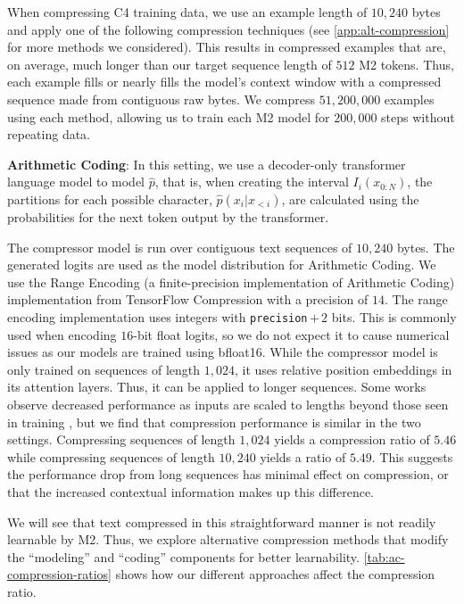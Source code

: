When compressing C4 training data, we use an example length of $10{,}240$ bytes and apply one of the following compression techniques (see \ref{app:alt-compression} for more methods we considered). This results in compressed examples that are, on average, much longer than our target sequence length of $512$ M2 tokens. Thus, each example fills or nearly fills the model's context window with a compressed sequence made from contiguous raw bytes. We compress $51{,}200{,}000$ examples using each method, allowing us to train each M2 model for $200{,}000$ steps without repeating data.

\textbf{Arithmetic Coding}: In this setting, we use a decoder-only transformer language model to model $\hat{p}$, that is, when creating the interval $I_{i}(x_{0:N})$, the partitions for each possible character, $\hat{p}(x_i | x_{<i})$, are calculated using the probabilities for the next token output by the transformer.

The compressor model is run over contiguous text sequences of $10{,}240$ bytes. The generated logits are used as the model distribution for Arithmetic Coding. We use the Range Encoding (a finite-precision implementation of Arithmetic Coding) implementation from TensorFlow Compression \cite{tfc_github} with a precision of $14$. The range encoding implementation uses integers with \texttt{precision}\,$+\,2$ bits. This is commonly used when encoding $16$-bit float logits, so we do not expect it to cause numerical issues as our models are trained using bfloat16. While the compressor model is only trained on sequences of length $1{,}024$, it uses relative position embeddings in its attention layers. Thus, it can be applied to longer sequences. Some works observe decreased performance as inputs are scaled to lengths beyond those seen in training \cite{varisSequenceLengthDomain2021,press2022train}, but we find that compression performance is similar in the two settings. Compressing sequences of length $1{,}024$ yields a compression ratio of $5.46$ while compressing sequences of length $10{,}240$ yields a ratio of $5.49$. This suggests the performance drop from long sequences has minimal effect on compression, or that the increased contextual information makes up this difference.

We will see that text compressed in this straightforward manner is not readily learnable by M2\@. Thus, we explore alternative compression methods that modify the ``modeling'' and ``coding'' components for better learnability. \ref{tab:ac-compression-ratios} shows how our different approaches affect the compression ratio.

